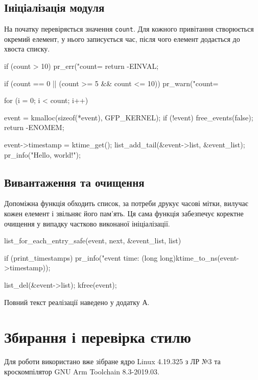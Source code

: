 \documentclass[12pt,a4paper]{article}
\begin{document}
\subsection{Ініціалізація модуля}

На початку перевіряється значення \texttt{count}. Для кожного привітання
створюється окремий елемент, у нього записується час, після чого елемент
додається до хвоста списку.

\begin{code}
if (count > 10) {
    pr_err("count=%
    return -EINVAL;
}

if (count == 0 || (count >= 5 && count <= 10))
    pr_warn("count=%

for (i = 0; i < count; i++) {
    event = kmalloc(sizeof(*event), GFP_KERNEL);
    if (!event) {
        free_events(false);
        return -ENOMEM;
    }

    event->timestamp = ktime_get();
    list_add_tail(&event->list, &event_list);
    pr_info("Hello, world!\n");
}
\end{code}

\subsection{Вивантаження та очищення}

Допоміжна функція обходить список, за потреби друкує часові мітки, вилучає
кожен елемент і звільняє його пам'ять. Ця сама функція забезпечує коректне
очищення у випадку частково виконаної ініціалізації.

\begin{code}
list_for_each_entry_safe(event, next, &event_list, list) {
    if (print_timestamps)
        pr_info("event time: %
                (long long)ktime_to_ns(event->timestamp));

    list_del(&event->list);
    kfree(event);
}
\end{code}

Повний текст реалізації наведено у додатку А.

\section{Збирання і перевірка стилю}

Для роботи використано вже зібране ядро Linux 4.19.325 з ЛР №3 та
кроскомпілятор GNU Arm Toolchain 8.3-2019.03.

\end{document}
